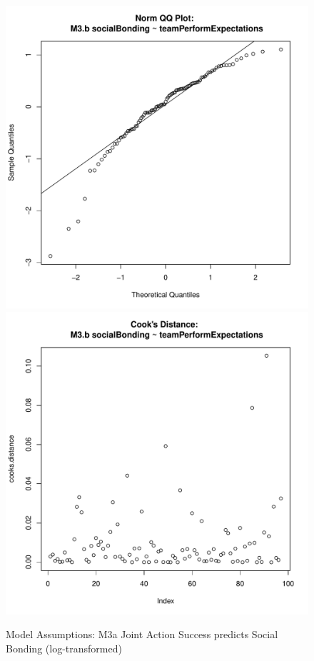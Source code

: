 {\begin{figure}[htbp]
  \includegraphics[scale =.4]{images/MLM3bQQNorm.pdf}
  \includegraphics[scale =.4]{images/MLM3bCooksD.pdf}
  \caption{Model Assumptions: M3a Joint Action Success predicts Social Bonding (log-transformed)}
  \label{fig:MLM3bAssumptions}
\end{figure}

}

